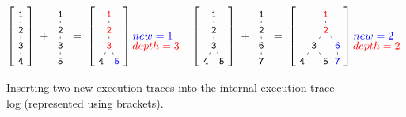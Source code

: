 \documentclass[sigconf,review,anonymous]{acmart}
\begin{document}
\begin{figure}[b]
\scriptsize
\newcommand\stacked[2]{\underset{\textstyle #2\mathstrut}{#1}}
\begin{align*}
  \nonumber
  \left[
  \tikz[
    baseline=-8mm,
    level distance=0.5cm,
    level 1/.style={sibling distance=0.5cm},
    level 2/.style={sibling distance=0.5cm}
  ]{
    \node {\small \texttt{1}}
      child {node {\small \texttt{2}}
        child {node {\small \texttt{3}}
          child {node {\small \texttt{4}}}
        }
      }
  }
  \right]
  \;
  +
  \;
  \tikz[
    baseline=-8mm,
    level distance=0.5cm,
    level 1/.style={sibling distance=0.5cm},
    level 2/.style={sibling distance=0.5cm}
  ]{
    \node {\small \texttt{1}}
      child {node {\small \texttt{2}}
        child {node {\small \texttt{3}}
          child {node {\small \texttt{5}}}
        }
      }
  }
  \;
  =
  \;
  \left[
  \tikz[
    baseline=-8mm,
    level distance=0.5cm,
    level 1/.style={sibling distance=0.5cm},
    level 2/.style={sibling distance=0.5cm}
  ]{
    \node {\color{red} \small \texttt{1}}
      child {node {\color{red} \small \texttt{2}}
        child {node {\color{red} \small \texttt{3}}
          child {node {\small \texttt{4}}}
          child {node {\color{blue} \small \texttt{5}}}
        }
      }
  }
  \right]
  \stacked{{\color{blue} new=1\phantom{x}}}{{\color{red} depth=3}}
  \quad
  \left[
  \tikz[
    baseline=-8mm,
    level distance=0.5cm,
    level 1/.style={sibling distance=0.5cm},
    level 2/.style={sibling distance=0.5cm}
  ]{
    \node {\small \texttt{1}}
      child {node {\small \texttt{2}}
        child {node {\small \texttt{3}}
          child {node {\small \texttt{4}}}
          child {node {\small \texttt{5}}}
        }
      }
  }
  \right]
  \;
  +
  \;
  \tikz[
    baseline=-8mm,
    level distance=0.5cm,
    level 1/.style={sibling distance=0.5cm},
    level 2/.style={sibling distance=0.5cm}
  ]{
    \node {\small \texttt{1}}
      child {node {\small \texttt{2}}
        child {node {\small \texttt{6}}
          child {node {\small \texttt{7}}
          }
        }
      }
  }
  \;
  =
  \;
  \left[
  \tikz[
    baseline=-8mm,
    level distance=0.5cm,
    level 1/.style={sibling distance=0.5cm},
    level 2/.style={sibling distance=0.75cm}
  ]{
    \node {\color{red} \small \texttt{1}}
      child {node {\color{red} \small \texttt{2}}
        child {node {\small \texttt{3}}
          child {node {\small \texttt{4}}}
          child {node {\small \texttt{5}}}
        }
        child {node {\color{blue}\small \texttt{6}}
          child {node {\color{blue}\small \texttt{7}}}
        }
      }
  }
  \right]
  \stacked{{\color{blue} new=2\phantom{x}}}{{\color{red} depth=2}}
\end{align*}
\vspace{-10pt}
\caption{\label{fig:mutagen:tracelog}Inserting two new execution traces into the
  internal execution trace log (represented using brackets).}
\end{figure}
\end{document}
